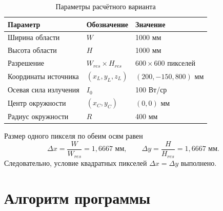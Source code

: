 \documentclass[a4paper,12pt]{article}
\begin{document}
\begin{table}[H]
  \centering
  \caption{Параметры расчётного варианта}
  \label{tab:parameters}
  \begin{tabular}{@{}lll@{}}
    \toprule
    Параметр & Обозначение & Значение \\
    \midrule
    Ширина области & $W$ & 1000 мм \\
    Высота области & $H$ & 1000 мм \\
    Разрешение & $W_{res}\times H_{res}$ & $600\times600$ пикселей \\
    Координаты источника & $(x_L,y_L,z_L)$ & $(200,-150,800)$ мм \\
    Осевая сила излучения & $I_0$ & 100 Вт/ср \\
    Центр окружности & $(x_C,y_C)$ & $(0,0)$ мм \\
    Радиус окружности & $R$ & 400 мм \\
    \bottomrule
  \end{tabular}
\end{table}

Размер одного пикселя по обеим осям равен
\begin{equation}
  \Delta x=\frac{W}{W_{res}}=1{,}6667\text{ мм},\qquad
  \Delta y=\frac{H}{H_{res}}=1{,}6667\text{ мм}.
\end{equation}
Следовательно, условие квадратных пикселей $\Delta x=\Delta y$ выполнено.

\section{Алгоритм программы}
\end{document}
